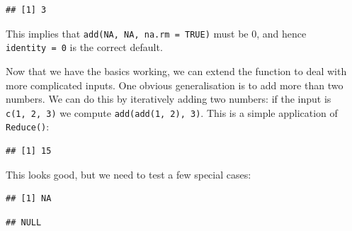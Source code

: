 \begin{verbatim}
## [1] 3
\end{verbatim}

This implies that \texttt{add(NA,\ NA,\ na.rm\ =\ TRUE)} must be 0, and
hence \texttt{identity\ =\ 0} is the correct default.

Now that we have the basics working, we can extend the function to deal
with more complicated inputs. One obvious generalisation is to add more
than two numbers. We can do this by iteratively adding two numbers: if
the input is \texttt{c(1,\ 2,\ 3)} we compute
\texttt{add(add(1,\ 2),\ 3)}. This is a simple application of
\texttt{Reduce()}:

\begin{Shaded}
\begin{Highlighting}[]
\StringTok{ } \NormalTok{) \{}
  \NormalTok{(}
\NormalTok{\}}
\NormalTok{(}\NormalTok{(}\NormalTok{, }\NormalTok{, }\NormalTok{))}
\end{Highlighting}
\end{Shaded}

\begin{verbatim}
## [1] 15
\end{verbatim}

This looks good, but we need to test a few special cases:

\begin{Shaded}
\begin{Highlighting}[]
\NormalTok{(}\NormalTok{, } \NormalTok{)}
\end{Highlighting}
\end{Shaded}

\begin{verbatim}
## [1] NA
\end{verbatim}

\begin{Shaded}
\begin{Highlighting}[]
\NormalTok{(}\NormalTok{())}
\end{Highlighting}
\end{Shaded}

\begin{verbatim}
## NULL
\end{verbatim}

